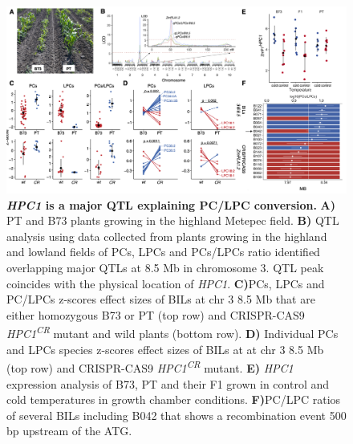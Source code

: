 \documentclass[9pt,twocolumn,twoside,lineno]{BioRxiv}
\begin{document}
\begin{figure}[!ht]
\begin{center}
\includegraphics[width=0.8\paperwidth]{Figures/Fig_3.png}
\caption{\textbf{\textit{HPC1} is a major QTL explaining PC/LPC conversion.} 
\textbf{A)} PT and B73 plants growing in the highland Metepec field. 
\textbf{B)} QTL analysis using data collected from plants growing in the highland and lowland fields of PCs, LPCs and PCs/LPCs ratio identified overlapping major QTLs at 8.5 Mb in chromosome 3. 
QTL peak coincides with the physical location of \textit{HPC1}. 
\textbf{C)}PCs, LPCs and PC/LPCs z-scores effect sizes of BILs at chr 3 8.5 Mb that are either homozygous B73 or PT (top row) and CRISPR-CAS9 \textit{HPC1\textsuperscript{CR}} mutant and wild plants (bottom row).        
\textbf{D)} Individual PCs and LPCs species z-scores effect sizes of BILs at at chr 3 8.5 Mb (top row) and CRISPR-CAS9 \textit{HPC1\textsuperscript{CR}} mutant.
\textbf{E)} \textit{HPC1} expression analysis of B73, PT and their F1 grown in control and cold temperatures in growth chamber conditions.
\textbf{F)}PC/LPC ratios of several BILs including B042 that shows a recombination event 500 bp upstream of the ATG.}
\label{Fig3}
\end{center}
\end{figure} 
\end{document}
